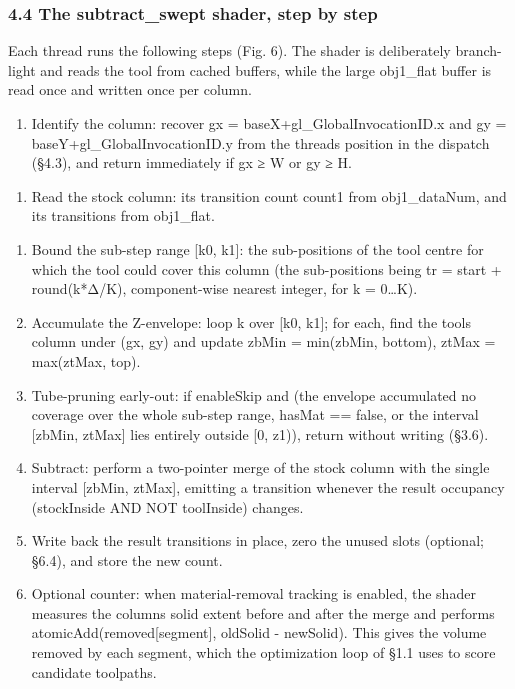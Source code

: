 \documentclass[
]{article}
\begin{document}
\hypertarget{the-subtract_swept-shader-step-by-step}{%
\subsubsection{4.4 The subtract\_swept shader, step by
step}\label{the-subtract_swept-shader-step-by-step}}

Each thread runs the following steps (Fig. 6). The shader is
deliberately branch-light and reads the tool from cached buffers, while
the large obj1\_flat buffer is read once and written once per column.

\begin{enumerate}
\def\labelenumi{\arabic{enumi}.}
\item
  Identify the column: recover gx = baseX+gl\_\allowbreak GlobalInvocationID.x and
  gy = baseY+gl\_\allowbreak GlobalInvocationID.y from the thread\textquotesingle s
  position in the dispatch (§4.3), and return immediately if gx ≥ W or
  gy ≥ H.
\end{enumerate}

\begin{enumerate}
\def\labelenumi{\arabic{enumi}.}
\setcounter{enumi}{1}
\item
  Read the stock column: its transition count count1 from obj1\_dataNum,
  and its transitions from obj1\_flat.
\end{enumerate}

\begin{enumerate}
\def\labelenumi{\arabic{enumi}.}
\setcounter{enumi}{1}
\item
  Bound the sub-step range {[}k0, k1{]}: the sub-positions of the tool
  centre for which the tool could cover this column (the sub-positions
  being tr = start + round(k*Δ/K), component-wise nearest integer, for k
  = 0\ldots K).
\item
  Accumulate the Z-envelope: loop k over {[}k0, k1{]}; for each, find
  the tool\textquotesingle s column under (gx, gy) and update zbMin =
  min(zbMin, bottom), ztMax = max(ztMax, top).
\item
  Tube-pruning early-out: if enableSkip and (the envelope accumulated no
  coverage over the whole sub-step range, hasMat == false, or the
  interval {[}zbMin, ztMax{]} lies entirely outside {[}0, z1)), return
  without writing (§3.6).
\item
  Subtract: perform a two-pointer merge of the stock column with the
  single interval {[}zbMin, ztMax{]}, emitting a transition whenever the
  result occupancy (stockInside AND NOT toolInside) changes.
\item
  Write back the result transitions in place, zero the unused slots
  (optional; §6.4), and store the new count.
\item
  Optional counter: when material-removal tracking is enabled, the
  shader measures the column\textquotesingle s solid extent before and
  after the merge and performs atomicAdd(removed{[}segment{]}, oldSolid
  - newSolid). This gives the volume removed by each segment, which the
  optimization loop of §1.1 uses to score candidate toolpaths.
\end{enumerate}
\end{document}
